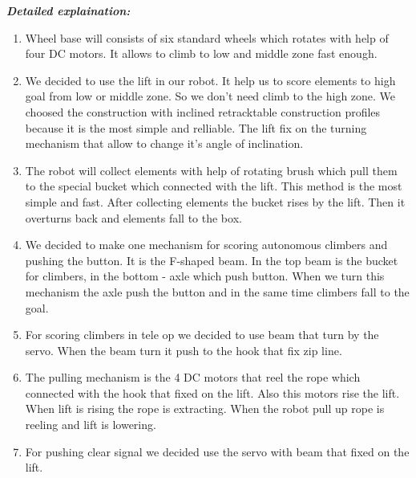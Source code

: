 \newline
\textit{\textbf{Detailed explaination:}}
\begin{enumerate}
	\item Wheel base will consists of six standard wheels which rotates with help of four DC motors. It allows to climb to low and middle zone fast enough.
	
	\item We decided to use the lift in our robot. It help us to score elements to high goal from low or middle zone. So we don't need climb to the high zone. We choosed the construction with inclined retracktable construction profiles because it is the most simple and relliable. The lift fix on the turning mechanism that allow to change it's angle of inclination.
	
	\item The robot will collect elements with help of rotating brush which pull them to the special bucket which connected with the lift. This method is the most simple and fast. After collecting elements the bucket rises by the lift. Then it overturns back and elements fall to the box.
	
	\item We decided to make one mechanism for scoring autonomous climbers and pushing the button. It is the F-shaped beam. In the top beam is the bucket for climbers, in the bottom - axle which push button. When we turn this mechanism the axle push the button and in the same time climbers fall to the goal.
	
	\item For scoring climbers in tele op we decided to use beam that turn by the servo. When the beam turn it push to the hook that fix zip line.
	
	\item The pulling mechanism is the 4 DC motors that reel the rope which connected with the hook that fixed on the lift. Also this motors rise the lift. When lift is rising the rope is extracting. When the robot pull up rope is reeling and lift is lowering. 
	
	\item For pushing clear signal we decided use the servo with beam that fixed on the lift.

	
\end{enumerate}

\newline


\fillpage
